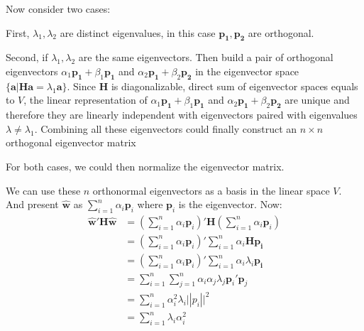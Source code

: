 \documentclass{article}
\newcommand{\V}[1]{\boldsymbol{#1}}
\begin{document}
Now consider two cases:

First,  
\(\lambda_1, \lambda_2\) are distinct eigenvalues, in this case
\(\V{p_1}, \V{p_2}\) are orthogonal.

\vspace{2mm}
Second, if \(\lambda_1, \lambda_2\) are the same eigenvectors. Then
build a pair of orthogonal eigenvectors \(\alpha_1\V{p_1} + \beta_1\V{p_1}\)
and \(\alpha_2\V{p_1}+\beta_2\V{p_2}\) in the eigenvector space
\(\{\V{a}|\V{H}\V{a}=\lambda_1\V{a}\}\). Since \(\V{H}\) is diagonalizable,
direct sum of eigenvector spaces equals to \(V\), the linear representation of \(\alpha_1\V{p_1} + \beta_1\V{p_1}\)
and \(\alpha_2\V{p_1}+\beta_2\V{p_2}\) are unique and therefore they are 
linearly independent
with eigenvectors paired with eigenvalues \(\lambda\neq \lambda_1\). Combining
all these eigenvectors could finally construct an \(n\times n\) orthogonal eigenvector matrix 

\vspace{2mm}
For both cases, we could then normalize the eigenvector matrix.

We can use these \(n\) orthonormal eigenvectors as a basis in the
linear space \(V\). And present \(\hat{\V{w}}\) as
\(\sum_{i=1}^n\alpha_i\V{p}_i\) where \(\V{p}_i\) is the eigenvector.
Now:
\begin{equation}
\begin{split}
\hat{\V{w}}'\V{H}\hat{\V{w}}
&=(\sum_{i=1}^n\alpha_i\V{p}_i)'\V{H}(\sum_{i=1}^n\alpha_i\V{p}_i)\\
&=(\sum_{i=1}^n\alpha_i\V{p}_i)'\sum_{i=1}^n
\alpha_i\V{H}\V{p_i}\\
&=(\sum_{i=1}^n\alpha_i\V{p}_i)'\sum_{i=1}^n\alpha_i\lambda_i\V{p_i}\\
&=\sum_{i=1}^n\sum_{j=1}^n\alpha_i\alpha_j\lambda_j\V{p}_i'\V{p}_j\\
&=\sum_{i=1}^n\alpha_i^2\lambda_i\V||{p}_i||^2\\
&=\sum_{i=1}^n\lambda_i\alpha_i^2
\end{split}
\end{equation}
\end{document}
